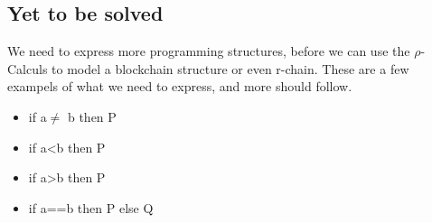 \subsection{Yet to be solved}
We need to express more programming structures, before we can use the $\rho$-Calculs to model a blockchain structure or even r-chain. These are a few exampels of what we need to express, and more should follow.
\begin{itemize}
\item if a$\neq$ b then P
\item if a<b then P
\item if a>b then P
\item if a==b then P else Q
\end{itemize}




